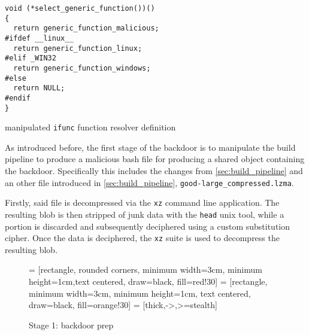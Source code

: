 \begin{listing}[H]
    \begin{verbatim}
void (*select_generic_function())() 
{
  return generic_function_malicious;
#ifdef __linux__
  return generic_function_linux;
#elif _WIN32
  return generic_function_windows;
#else
  return NULL;
#endif
}
    \end{verbatim}
    \label{code:example_ifunc_backdoor_resolver}
    \caption{manipulated \texttt{ifunc} function resolver definition}
\end{listing}

As introduced before, the first stage of the backdoor is to manipulate the
build pipeline to produce a malicious bash file for producing a shared object
containing the backdoor. Specifically this includes the changes from
\autoref{sec:build_pipeline} and an other file introduced in
\autoref{sec:build_pipeline}, \texttt{good-large\_compressed.lzma}.

Firstly, said file is decompressed via the \texttt{xz} command line
application. The resulting blob is then stripped of junk data with the
\texttt{head} unix tool, while a portion is discarded and subsequently
deciphered using a custom substitution cipher. Once the data is deciphered, the
\texttt{xz} suite is used to decompress the resulting blob. 

\begin{figure}[H]
    \centering

     = [rectangle, rounded corners, minimum width=3cm, minimum height=1cm,text centered, draw=black, fill=red!30]
     = [rectangle, minimum width=3cm, minimum height=1cm, text centered, draw=black, fill=orange!30]
     = [thick,->,>=stealth]
    \label{chart:dependecies}
    \caption{Stage 1: backdoor prep}
\end{figure}

